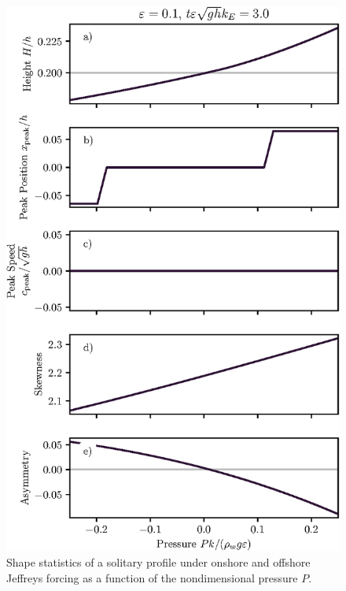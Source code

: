 \documentclass{jfm}
\begin{document}
\begin{figure}
  \centering
  \includegraphics{Skew-Asymm-P.eps}
  \caption{
    Shape statistics of a solitary profile under onshore and offshore
    Jeffreys forcing as a function of the nondimensional pressure $P$.
  }
\end{figure}
\end{document}
